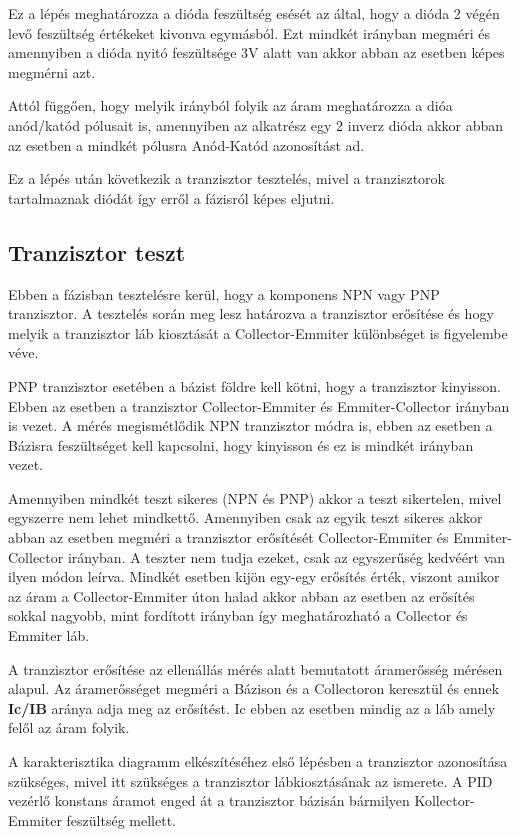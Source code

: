 Ez a lépés meghatározza a dióda feszültség esését az által, hogy a 
dióda 2 végén levő feszültség értékeket kivonva egymásból.
Ezt mindkét irányban megméri és amennyiben a dióda nyitó
feszültsége 3V alatt van akkor abban az esetben képes megmérni azt.

Attól függően, hogy melyik irányból folyik az áram meghatározza
a dióa anód/katód pólusait is, amennyiben az alkatrész egy 
2 inverz dióda akkor abban az esetben a mindkét pólusra 
Anód-Katód azonosítást ad.

Ez a lépés után következik a tranzisztor tesztelés, mivel a
tranzisztorok tartalmaznak diódát így erről a fázisról képes eljutni.

\subsection{Tranzisztor teszt}

Ebben a fázisban tesztelésre kerül, hogy a komponens NPN vagy PNP tranzisztor.
A tesztelés során meg lesz határozva a tranzisztor erősítése és hogy 
melyik a tranzisztor láb kiosztását a Collector-Emmiter különbséget is figyelembe
véve.

PNP tranzisztor esetében a bázist földre kell kötni, hogy a tranzisztor kinyisson.
Ebben az esetben a tranzisztor Collector-Emmiter és Emmiter-Collector irányban
is vezet. A mérés megismétlődik NPN tranzisztor módra is, ebben az esetben 
a Bázisra feszültséget kell kapcsolni, hogy kinyisson és ez is mindkét irányban
vezet.

Amennyiben mindkét teszt sikeres (NPN és PNP) akkor a teszt sikertelen, mivel
egyszerre nem lehet mindkettő. Amennyiben csak az egyik teszt sikeres akkor
abban az esetben megméri a tranzisztor erősítését Collector-Emmiter és 
Emmiter-Collector irányban. A teszter nem tudja ezeket, csak az egyszerűség
kedvéért van ilyen módon leírva. Mindkét esetben kijön egy-egy erősítés érték,
viszont amikor az áram a Collector-Emmiter úton halad akkor abban az esetben
az erősítés sokkal nagyobb, mint fordított irányban így meghatározható a 
Collector és Emmiter láb.

A tranzisztor erősítése az ellenállás mérés alatt bemutatott áramerősség
mérésen alapul. Az áramerősséget megméri a Bázison és a Collectoron keresztül
és ennek \textbf{Ic/IB} aránya adja meg az erősítést. Ic ebben az esetben mindig
az a láb amely felől az áram folyik.

A karakterisztika diagramm elkészítéséhez első lépésben a tranzisztor azonosítása
szükséges, mivel itt szükséges a tranzisztor lábkiosztásának az ismerete.
A PID vezérlő konstans áramot enged át a tranzisztor bázisán bármilyen
Kollector-Emmiter feszültség mellett. 

